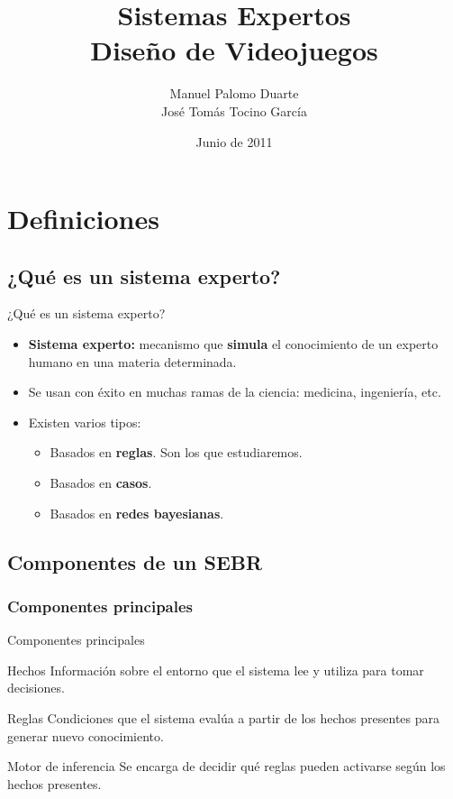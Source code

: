 \documentclass[smaller,spanish,xcolor=svgnames]{beamer}
\title[Sistemas Expertos]{{\Huge Sistemas Expertos} \\ Diseño de Videojuegos}
\author[Manuel Palomo Duarte - José Tomás Tocino]{Manuel Palomo Duarte \\ José Tomás Tocino García}
\date{Junio de 2011}
\begin{document}
\begin{frame}
  \titlepage
\end{frame}

\section{Definiciones}
\subsection{¿Qué es un sistema experto?}
\begin{frame}{¿Qué es un sistema experto?}
    \begin{itemize}
    \item \textbf{Sistema experto:} mecanismo que \textbf{simula} el
      conocimiento de un experto humano en una materia determinada.
    \item Se usan con éxito en muchas ramas de la ciencia: medicina, ingeniería, etc.
    \item Existen varios tipos:
      \begin{itemize}
      \item Basados en \textbf{reglas}. Son los que estudiaremos.
      \item Basados en \textbf{casos}.
      \item Basados en \textbf{redes bayesianas}.
      \end{itemize}
    \end{itemize}
\end{frame}

\subsection{Componentes de un SEBR}
\subsubsection{Componentes principales}

\begin{frame}{Componentes principales}
  \begin{block}{Hechos}
    Información sobre el entorno que el sistema lee y utiliza para tomar
    decisiones.
  \end{block}

  \begin{block}{Reglas}
    Condiciones que el sistema evalúa a partir de los hechos presentes para
    generar nuevo conocimiento.
  \end{block}

  \begin{block}{Motor de inferencia}
    Se encarga de decidir qué reglas pueden activarse según los hechos presentes.
  \end{block}
  
\end{frame}
\end{document}
